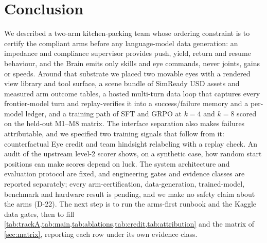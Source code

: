 \section{Conclusion}\label{sec:conclusion}
We described a two-arm kitchen-packing team whose ordering constraint is to certify the compliant arms before any language-model data generation: an impedance and compliance supervisor provides push, yield, return and resume behaviour, and the Brain emits only skills and eye commands, never joints, gains or speeds.
Around that substrate we placed two movable eyes with a rendered view library and tool surface, a scene bundle of SimReady USD assets and measured arm outcome tables, a hosted multi-turn data loop that captures every frontier-model turn and replay-verifies it into a success/failure memory and a per-model ledger, and a training path of SFT and GRPO at $k=4$ and $k=8$ scored on the held-out M1--M8 matrix.
The interface separation also makes failures attributable, and we specified two training signals that follow from it: counterfactual Eye credit and team hindsight relabeling with a replay check.
An audit of the upstream level-2 scorer shows, on a synthetic case, how random start positions can make scores depend on luck.
The system architecture and evaluation protocol are fixed, and engineering gates and evidence classes are reported separately; every arm-certification, data-generation, trained-model, benchmark and hardware result is pending, and we make no safety claim about the arms (D-22).
The next step is to run the arms-first runbook and the Kaggle data gates, then to fill \cref{tab:trackA,tab:main,tab:ablations,tab:credit,tab:attribution} and the matrix of \cref{sec:matrix}, reporting each row under its own evidence class.
